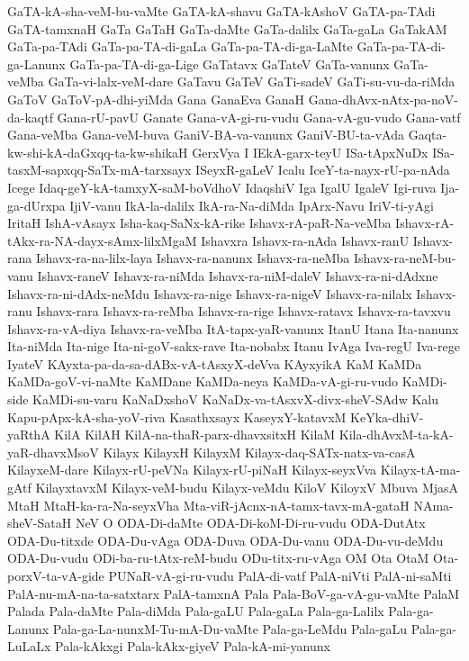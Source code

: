 {GaTA-kA-sha-veM-bu-vaMte
GaTA-kA-shavu
GaTA-kAshoV
GaTA-pa-TAdi
GaTA-tamxnaH
GaTa
GaTaH
GaTa-daMte
GaTa-dalilx
GaTa-gaLa
GaTakAM
GaTa-pa-TAdi
GaTa-pa-TA-di-gaLa
GaTa-pa-TA-di-ga-LaMte
GaTa-pa-TA-di-ga-Lanunx
GaTa-pa-TA-di-ga-Lige
GaTatavx
GaTateV
GaTa-vanunx
GaTa-veMba
GaTa-vi-lalx-veM-dare
GaTavu
GaTeV
GaTi-sadeV
GaTi-su-vu-da-riMda
GaToV
GaToV-pA-dhi-yiMda
Gana
GanaEva
GanaH
Gana-dhAvx-nAtx-pa-noV-da-kaqtf
Gana-rU-pavU
Ganate
Gana-vA-gi-ru-vudu
Gana-vA-gu-vudo
Gana-vatf
Gana-veMba
Gana-veM-buva
GaniV-BA-va-vanunx
GaniV-BU-ta-vAda
Gaqta-kw-shi-kA-daGxqq-ta-kw-shikaH
GerxVya
I
IEkA-garx-teyU
ISa-tApxNuDx
ISa-tasxM-sapxqq-SaTx-mA-tarxsayx
ISeyxR-gaLeV
Icalu
IceY-ta-nayx-rU-pa-nAda
Icege
Idaq-geY-kA-tamxyX-saM-boVdhoV
IdaqshiV
Iga
IgalU
IgaleV
Igi-ruva
Ija-ga-dUrxpa
IjiV-vanu
IkA-la-dalilx
IkA-ra-Na-diMda
IpArx-Navu
IriV-ti-yAgi
IritaH
IshA-vAsayx
Isha-kaq-SaNx-kA-rike
Ishavx-rA-paR-Na-veMba
Ishavx-rA-tAkx-ra-NA-dayx-sAmx-lilxMgaM
Ishavxra
Ishavx-ra-nAda
Ishavx-ranU
Ishavx-rana
Ishavx-ra-na-lilx-laya
Ishavx-ra-nanunx
Ishavx-ra-neMba
Ishavx-ra-neM-bu-vanu
Ishavx-raneV
Ishavx-ra-niMda
Ishavx-ra-niM-daleV
Ishavx-ra-ni-dAdxne
Ishavx-ra-ni-dAdx-neMdu
Ishavx-ra-nige
Ishavx-ra-nigeV
Ishavx-ra-nilalx
Ishavx-ranu
Ishavx-rara
Ishavx-ra-reMba
Ishavx-ra-rige
Ishavx-ratavx
Ishavx-ra-tavxvu
Ishavx-ra-vA-diya
Ishavx-ra-veMba
ItA-tapx-yaR-vanunx
ItanU
Itana
Ita-nanunx
Ita-niMda
Ita-nige
Ita-ni-goV-sakx-rave
Ita-nobabx
Itanu
IvAga
Iva-regU
Iva-rege
IyateV
KAyxta-pa-da-sa-dABx-vA-tAsxyX-deVva
KAyxyikA
KaM
KaMDa
KaMDa-goV-vi-naMte
KaMDane
KaMDa-neya
KaMDa-vA-gi-ru-vudo
KaMDi-side
KaMDi-su-varu
KaNaDxshoV
KaNaDx-va-tAsxvX-divx-sheV-SAdw
Kalu
Kapu-pApx-kA-sha-yoV-riva
Kasathxsayx
KaseyxY-katavxM
KeYka-dhiV-yaRthA
KilA
KilAH
KilA-na-thaR-parx-dhavxsitxH
KilaM
Kila-dhAvxM-ta-kA-yaR-dhavxMsoV
Kilayx
KilayxH
KilayxM
Kilayx-daq-SATx-natx-va-casA
KilayxeM-dare
Kilayx-rU-peVNa
Kilayx-rU-piNaH
Kilayx-seyxVva
Kilayx-tA-ma-gAtf
KilayxtavxM
Kilayx-veM-budu
Kilayx-veMdu
KiloV
KiloyxV
Mbuva
MjasA
MtaH
MtaH-ka-ra-Na-seyxVha
Mta-viR-jAcnx-nA-tamx-tavx-mA-gataH
NAma-sheV-SataH
NeV
O
ODA-Di-daMte
ODA-Di-koM-Di-ru-vudu
ODA-DutAtx
ODA-Du-titxde
ODA-Du-vAga
ODA-Duva
ODA-Du-vanu
ODA-Du-vu-deMdu
ODA-Du-vudu
ODi-ba-ru-tAtx-reM-budu
ODu-titx-ru-vAga
OM
Ota
OtaM
Ota-porxV-ta-vA-gide
PUNaR-vA-gi-ru-vudu
PalA-di-vatf
PalA-niVti
PalA-ni-saMti
PalA-nu-mA-na-ta-satxtarx
PalA-tamxnA
Pala
Pala-BoV-ga-vA-gu-vaMte
PalaM
Palada
Pala-daMte
Pala-diMda
Pala-gaLU
Pala-gaLa
Pala-ga-Lalilx
Pala-ga-Lanunx
Pala-ga-La-nunxM-Tu-mA-Du-vaMte
Pala-ga-LeMdu
Pala-gaLu
Pala-ga-LuLaLx
Pala-kAkxgi
Pala-kAkx-giyeV
Pala-kA-mi-yanunx
}
